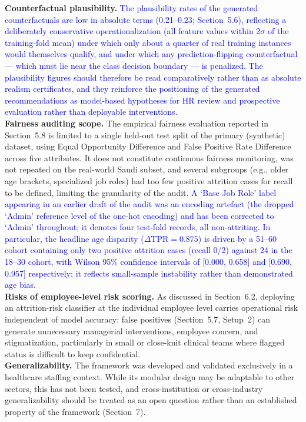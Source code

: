 \documentclass[a4paper,fleqn]{cas-sc}
\begin{document}
{{\textbf{Counterfactual plausibility.} \textcolor{blue}{The plausibility rates of the generated counterfactuals are low in absolute terms (0.21--0.23; Section~5.6), reflecting a deliberately conservative operationalization (all feature values within 2$\sigma$ of the training-fold mean) under which only about a quarter of real training instances would themselves qualify, and under which any prediction-flipping counterfactual --- which must lie near the class decision boundary --- is penalized. The plausibility figures should therefore be read comparatively rather than as absolute realism certificates, and they reinforce the positioning of the generated recommendations as model-based hypotheses for HR review and prospective evaluation rather than deployable interventions.}\\
\textbf{Fairness auditing scope.} The empirical fairness evaluation reported in Section~5.8 is limited to a single held-out test split of the primary (synthetic) dataset, using Equal Opportunity Difference and False Positive Rate Difference across five attributes. It does not constitute continuous fairness monitoring, was not repeated on the real-world Saudi subset, and several subgroups (e.g., older age brackets, specialized job roles) had too few positive attrition cases for recall to be defined, limiting the granularity of the audit. \textcolor{blue}{A `Base Job Role' label appearing in an earlier draft of the audit was an encoding artefact (the dropped `Admin' reference level of the one-hot encoding) and has been corrected to `Admin' throughout; it denotes four test-fold records, all non-attriting.} \textcolor{blue}{In particular, the headline age disparity ($\Delta\text{TPR} = 0.875$) is driven by a 51–60 cohort containing only two positive attrition cases (recall 0/2) against 24 in the 18–30 cohort, with Wilson 95\% confidence intervals of [0.000, 0.658] and [0.690, 0.957] respectively; it reflects small-sample instability rather than demonstrated age bias.}\\
\textbf{Risks of employee-level risk scoring.} As discussed in Section~6.2, deploying an
attrition-risk classifier at the individual employee level carries operational risk independent of model accuracy: false positives (Section~5.7, Setup~2) can generate unnecessary managerial interventions, employee concern, and stigmatization, particularly in small or close-knit clinical teams where flagged status is difficult to keep confidential.\\
\textbf{Generalizability.} The framework was developed and validated exclusively in a healthcare
staffing context. While its modular design may be adaptable to other sectors, this has not been tested, and cross-institution or cross-industry generalizability should be treated as an open question rather than an established property of the framework (Section~7).
}

}
\end{document}
